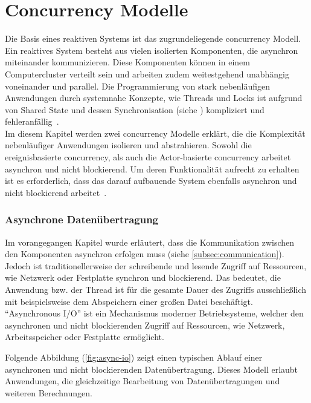 \section{Concurrency Modelle}\label{sec:concurrency-models}
Die Basis eines reaktiven Systems ist das zugrundeliegende \gls{concurrency} Modell. Ein reaktives System besteht aus vielen isolierten Komponenten, die asynchron miteinander kommunizieren. Diese Komponenten können in einem Computercluster verteilt sein und arbeiten zudem weitestgehend unabhängig voneinander und parallel. Die Programmierung von stark nebenläufigen Anwendungen durch systemnahe Konzepte, wie Threads und Locks ist aufgrund von Shared State und dessen Synchronisation (siehe ) kompliziert und fehleranfällig~\cite[S.~72]{erb_concurrent_2012}.\\
Im diesem Kapitel werden zwei \gls{concurrency} Modelle erklärt, die die Komplexität nebenläufiger Anwendungen isolieren und abstrahieren. Sowohl die ereignisbasierte \gls{concurrency}, als auch die Actor-basierte \gls{concurrency} arbeitet asynchron und nicht blockierend. Um deren Funktionalität aufrecht zu erhalten ist es erforderlich, dass das darauf aufbauende System ebenfalls asynchron und nicht blockierend arbeitet~\cite[S.~171]{kuhn_reactive_2015}.

\subsubsection{Asynchrone Datenübertragung}\label{subsec:async-io}
Im vorangegangen Kapitel wurde erläutert, dass die Kommunikation zwischen den Komponenten asynchron erfolgen muss (siehe \ref{subsec:communication}). Jedoch ist traditionellerweise der schreibende und lesende Zugriff auf Ressourcen, wie Netzwerk oder Festplatte synchron und blockierend. Das bedeutet, die Anwendung bzw. der Thread ist für die gesamte Dauer des Zugriffs ausschließlich mit beispielsweise dem Abspeichern einer großen Datei beschäftigt.\\
\enquote{Asynchronous I/O} ist ein Mechanismus moderner Betriebsysteme, welcher den asynchronen und nicht blockierenden Zugriff auf Ressourcen, wie Netzwerk, Arbeitsspeicher oder Festplatte ermöglicht.

\pagebreak

Folgende Abbildung (\ref{fig:async-io}) zeigt einen typischen Ablauf einer asynchronen und nicht blockierenden Datenübertragung. Dieses Modell erlaubt Anwendungen, die gleichzeitige Bearbeitung von Datenübertragungen und weiteren Berechnungen. 

